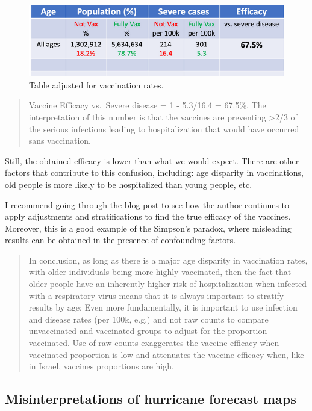 \documentclass[
]{book}
\begin{document}
\begin{figure}

{\centering \includegraphics[width=0.7\linewidth]{Figures/vaccines-ex-fig2} 

}

\caption{Table adjusted for vaccination rates.}\label{fig:vaccine-rates-b}
\end{figure}

\begin{quote}
Vaccine Efficacy vs.~Severe disease = 1 - 5.3/16.4 = 67.5\%.
The interpretation of this number is that the vaccines are preventing \textgreater2/3 of the serious infections leading to hospitalization that would have occurred sans vaccination.
\end{quote}

Still, the obtained efficacy is lower than what we would expect. There are other factors that contribute to this confusion, including: age disparity in vaccinations, old people is more likely to be hospitalized than young people, etc.

I recommend going through the blog post to see how the author continues to apply adjustments and stratifications to find the true efficacy of the vaccines. Moreover, this is a good example of the Simpson's paradox, where misleading results can be obtained in the presence of confounding factors.

\begin{quote}
In conclusion, as long as there is a major age disparity in vaccination rates, with older individuals being more highly vaccinated, then the fact that older people have an inherently higher risk of hospitalization when infected with a respiratory virus means that it is always important to stratify results by age; Even more fundamentally, it is important to use infection and disease rates (per 100k, e.g.) and not raw counts to compare unvaccinated and vaccinated groups to adjust for the proportion vaccinated. Use of raw counts exaggerates the vaccine efficacy when vaccinated proportion is low and attenuates the vaccine efficacy when, like in Israel, vaccines proportions are high.
\end{quote}

\hypertarget{viz-hurricane}{%
\subsection{Misinterpretations of hurricane forecast maps}\label{viz-hurricane}}
\end{document}
